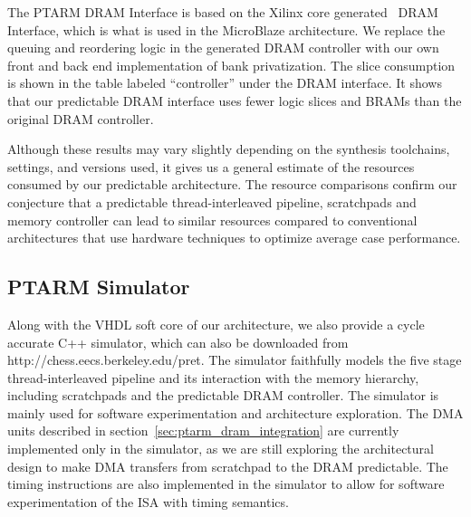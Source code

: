 The PTARM DRAM Interface is based on the Xilinx core generated~\cite{xilinx_coregen} DRAM Interface, which is what is used in the MicroBlaze architecture. 
We replace the queuing and reordering logic in the generated DRAM controller with our own front and back end implementation of bank privatization. 
The slice consumption is shown in the table labeled ``controller'' under the DRAM interface.
It shows that our predictable DRAM interface uses fewer logic slices and BRAMs than the original DRAM controller.

Although these results may vary slightly depending on the synthesis toolchains, settings, and versions used, it gives us a general estimate of the resources consumed by our predictable architecture. 
The resource comparisons confirm our conjecture that a predictable thread-interleaved pipeline, scratchpads and memory controller can lead to similar resources compared to conventional architectures that use hardware techniques to optimize average case performance. 	 
  
\subsection{PTARM Simulator}
\label{sec:ptarm_sim}
Along with the VHDL soft core of our architecture, we also provide a cycle accurate C++ simulator, which can also be downloaded from http://chess.eecs.berkeley.edu/pret. 
The simulator faithfully models the five stage thread-interleaved pipeline and its interaction with the memory hierarchy, including scratchpads and the predictable DRAM controller.
The simulator is mainly used for software experimentation and architecture exploration.    
The DMA units described in section~\ref{sec:ptarm_dram_integration} are currently implemented only in the simulator, as we are still exploring the architectural design to make DMA transfers from scratchpad to the DRAM predictable. 
The timing instructions are also implemented in the simulator to allow for software experimentation of the ISA with timing semantics.

